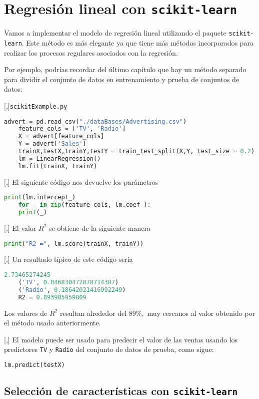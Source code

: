\section{Regresión lineal con \texttt{scikit-learn}}

Vamos a implementar el modelo de regresión lineal utilizando el paquete \texttt{scikit-learn}. Este método es más elegante ya que tiene más métodos incorporados para realizar
los procesos regulares asociados con la regresión.


Por ejemplo, podrías recordar
del último capítulo que hay un método separado para dividir el conjunto de datos en
entrenamiento y prueba de conjuntos de datos:

[,]{\texttt{scikitExample.py}}
\begin{lstlisting}[language=Python]
	advert = pd.read_csv("./dataBases/Advertising.csv")
	feature_cols = ['TV', 'Radio']
	X = advert[feature_cols]
	Y = advert['Sales']
	trainX,testX,trainY,testY = train_test_split(X,Y, test_size = 0.2)
	lm = LinearRegression()
	lm.fit(trainX, trainY)
\end{lstlisting}

[,]{}
El siguiente código nos devuelve los parámetros
\begin{lstlisting}[language=Python]
	print(lm.intercept_)
	for _ in zip(feature_cols, lm.coef_):
	print(_)
\end{lstlisting}

[,]{}
El valor $R^{2}$ se obtiene de la siguiente manera
\begin{lstlisting}[language=Python]
	print("R2 =", lm.score(trainX, trainY))
\end{lstlisting}

[,]{}
Un resultado típico de este código sería
\begin{lstlisting}[language=Python]
	2.73465274245
	('TV', 0.046830472078714387)
	('Radio', 0.18642021416992249)
	R2 = 0.893905959809
\end{lstlisting}


Los valores de $R^{2}$ resultan alrededor del $89\%,$ muy cercanos al valor obtenido por el método usado anteriormente.

[,]{}
El modelo puede ser usado para predecir el valor de las ventas usando los predictores \texttt{TV} y \texttt{Radio} del conjunto de datos de prueba, como sigue:
\begin{lstlisting}[language=Python]
	lm.predict(testX)
\end{lstlisting}


\subsection{Selección de características con \texttt{scikit-learn}}

